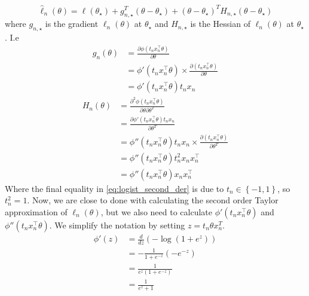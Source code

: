 \begin{equation}\label{eq:Taylor_exp}
    \hat{\ell}_n\left(\theta\right) = \ell\left(\theta_{\star}\right) + g^T_{n, \star}\left(\theta - \theta_{\star}\right) + \left(\theta - \theta_{\star}\right)^TH_{n, \star}\left(\theta - \theta_{\star}\right)  
\end{equation}
where $g_{n, \star}$ is the gradient $\ell_n\left(\theta\right)$ at $\theta_{\star}$ and $H_{n, \star}$ is the Hessian of $\ell_n\left(\theta\right)$ at $\theta_{\star}$.  I.e 
\begin{equation}
\begin{split}
    g_n\left(\theta\right) &= \frac{\partial\phi\left(t_nx_n^{\top}\theta \right)}{\partial\theta}\\ 
    &= \phi'\left(t_n x_n^{\top}\theta \right)\times \frac{\partial\left(t_n x_n^{\top} \theta \right)}{\partial\theta}  \\
    & = \phi'\left(t_n x_n^{\top}\theta \right) t_n x_n
\end{split}
\end{equation}
\begin{equation}\label{eq:logist_second_der}
    \begin{split}
    H_n\left(\theta\right) &= \frac{\partial^2\phi\left(t_n x_n^{\top}\theta  \right)}{\partial\theta\partial\theta^T} \\
    &= \frac{\partial \phi'\left(t_n x_n^{\top}\theta \right) t_n x_n}{\partial \theta^T} \\
    & = \phi''\left(t_n x_n^{\top} \theta \right) t_n x_n \times \frac{\partial\left(t_nx_n^{\top}\theta \right)}{\partial \theta^T} \\
    & = \phi''\left(t_n x_n^{\top}\theta \right) t_n^2 x_n x_n^{\top} \\
    & = \phi''\left(t_n x_n^{\top}\theta \right)x_n x_n^{\top}
\end{split}
\end{equation}
Where the final equality in \eqref{eq:logist_second_der} is due to $t_n \in \left\{-1, 1\right\}$, so $t_n^2 = 1$. 
Now, we are close to done with calculating the second order Taylor approximation of $\ell_n\left(\theta\right)$, but we also need to calculate $\phi'\left(t_n x_n^{\top}\theta \right)$ and $\phi''\left(t_n x_n^{\top}\theta \right)$. We simplify the notation by setting $z = t_n\theta x_n^T$. 
\begin{equation}\label{eq:logist_first_der} 
\begin{split}
\phi'\left(z\right) &= \frac{d}{dz} \left( - \log\left(1 + e^z\right)\right)\\ &= - \frac{1}{1 + e^{-z}} \left(-e^{-z}\right) \\
& = \frac{1}{e^z \left(1+e^{-z}\right)} \\
& = \frac{1}{e^z + 1}
\end{split}
\end{equation}
